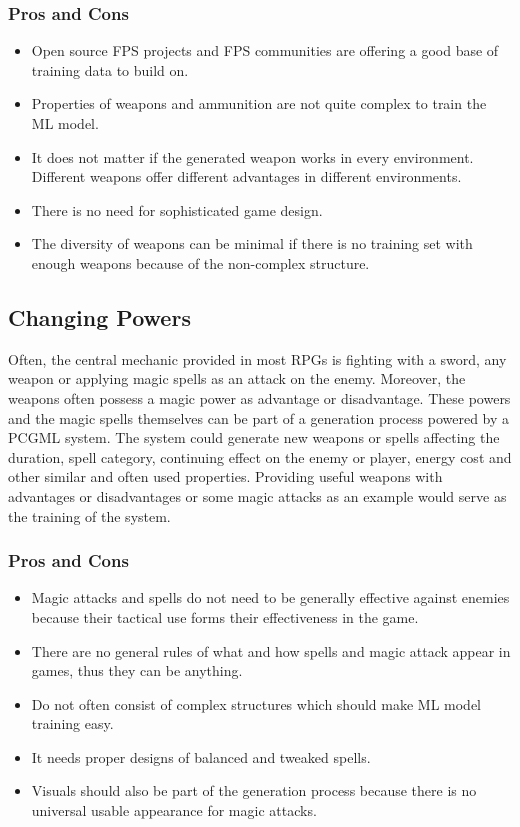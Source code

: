 \documentclass[MGS,Master,english]{twbook}%
\begin{document}
\subsubsection{Pros and Cons}
\begin{itemize}
	\item Open source FPS projects and FPS communities are offering a good base of training data to build on.
	\item Properties of weapons and ammunition are not quite complex to train the ML model.
	\item It does not matter if the generated weapon works in every environment. Different weapons offer different advantages in different environments.
	\item There is no need for sophisticated game design.
	\item The diversity of weapons can be minimal if there is no training set with enough weapons because of the non-complex structure.
\end{itemize}

\subsection{Changing Powers} \label{idea::changingPowers}
Often, the central mechanic provided in most \acp{RPG} is fighting with a sword, any weapon or applying magic spells as an attack on the enemy. Moreover, the weapons often possess a magic power as advantage or disadvantage. These powers and the magic spells themselves can be part of a generation process powered by a PCGML system. The system could generate new weapons or spells affecting the duration, spell category, continuing effect on the enemy or player, energy cost and other similar and often used properties. Providing useful weapons with advantages or disadvantages or some magic attacks as an example would serve as the training of the system.

\subsubsection{Pros and Cons}
\begin{itemize}
	\item Magic attacks and spells do not need to be generally effective against enemies because their tactical use forms their effectiveness in the game.
	\item There are no general rules of what and how spells and magic attack appear in games, thus they can be anything.
	\item Do not often consist of complex structures  which should make ML model training easy.
	\item It needs proper designs of balanced and tweaked spells.
	\item Visuals should also be part of the generation process because there is no universal usable appearance for magic attacks.
\end{itemize}
\end{document}
